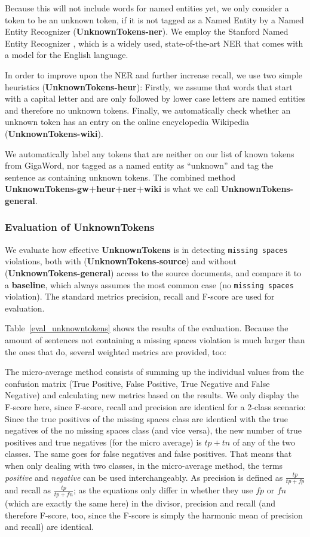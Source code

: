 \documentclass[a4paper,10pt]{scrartcl}
\theoremstyle{style}
\begin{document}
Because this will not include words for named entities yet, we only consider a token to be an unknown token, if it is not tagged as a Named Entity by a Named Entity Recognizer (\textbf{UnknownTokens-ner}). We employ the Stanford Named Entity Recognizer \citep{stanfordNER}, which is a widely used, state-of-the-art NER that comes with a model for the English language.

In order to improve upon the NER and further increase recall, we use two simple heuristics (\textbf{UnknownTokens-heur}): Firstly, we assume that words that start with a capital letter and are only followed by lower case letters are named entities and therefore no unknown tokens. Finally, we automatically check whether an unknown token has an entry on the online encyclopedia Wikipedia (\textbf{UnknownTokens-wiki}).

We automatically label any tokens that are neither on our list of known tokens from GigaWord, nor tagged as a named entity as ``unknown'' and tag the sentence as containing unknown tokens. The combined method \textbf{UnknownTokens-gw+heur+ner+wiki} is what we call \textbf{UnknownTokens-general}.

\subsubsection{Evaluation of UnknownTokens}
We evaluate how effective \textbf{UnknownTokens} is in detecting \texttt{missing spaces} violations, both with (\textbf{UnknownTokens-source}) and without (\textbf{UnknownTokens-general}) access to the source documents, and compare it to a \textbf{baseline}, which always assumes the most common case (no \texttt{missing spaces} violation).
The standard metrics precision, recall and F-score are used for evaluation.

Table~\ref{eval_unknowntokens} shows the results of the evaluation. Because the amount of sentences not containing a missing spaces violation is much larger than the ones that do, several weighted metrics are provided, too:

The micro-average method consists of summing up the individual values from the confusion matrix (True Positive, False Positive, True Negative and False Negative) and calculating new metrics based on the results. We only display the F-score here, since F-score, recall and precision are identical for a 2-class scenario: Since the true positives of the missing spaces class are identical with the true negatives of the no missing spaces class (and vice versa), the new number of true positives and true negatives (for the micro average) is $tp + tn$ of any of the two classes. The same goes for false negatives and false positives. That means that when only dealing with two classes, in the micro-average method, the terms \textit{positive} and \textit{negative} can be used interchangeably. As precision is defined as $\frac{tp}{tp+fp}$ and recall as $\frac{tp}{tp+fn}$; as the equations only differ in whether they use $fp$ or $fn$ (which are exactly the same here) in the divisor, precision and recall (and therefore F-score, too, since the F-score is simply the harmonic mean of precision and recall) are identical.
\end{document}
